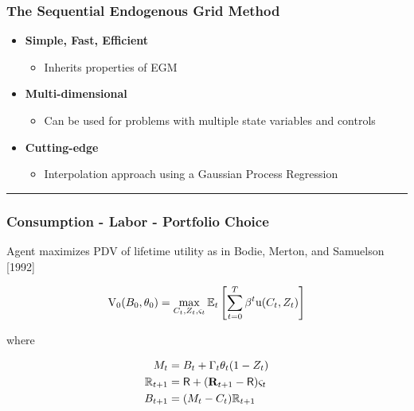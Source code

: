 \documentclass[
  letterpaper,
  DIV=11,
  numbers=noendperiod]{scrartcl}
\providecommand{\tightlist}{%
  \setlength{\itemsep}{0pt}\setlength{\parskip}{0pt}}\usepackage{longtable,booktabs,array}
\begin{document}
\hypertarget{the-sequential-endogenous-grid-method}{%
\subsubsection{The Sequential Endogenous Grid
Method}\label{the-sequential-endogenous-grid-method}}

\begin{itemize}
\tightlist
\item
  \textbf{Simple, Fast, Efficient}

  \begin{itemize}
  \tightlist
  \item
    Inherits properties of EGM
  \end{itemize}
\item
  \textbf{Multi-dimensional}

  \begin{itemize}
  \tightlist
  \item
    Can be used for problems with multiple state variables and controls
  \end{itemize}
\item
  \textbf{Cutting-edge}

  \begin{itemize}
  \tightlist
  \item
    Interpolation approach using a Gaussian Process Regression
  \end{itemize}
\end{itemize}

\begin{center}\rule{0.5\linewidth}{0.5pt}\end{center}

\hypertarget{consumption---labor---portfolio-choice}{%
\subsubsection{Consumption - Labor - Portfolio
Choice}\label{consumption---labor---portfolio-choice}}

Agent maximizes PDV of lifetime utility as in Bodie, Merton, and
Samuelson {[}1992{]}

\[\begin{equation}
\mathrm{V}_0(B_0, \theta_0) = \max_{C_{t}, Z_{t}, \varsigma_{t}} \mathbb{E}_{t} \left[ \sum_{t = 0}^{T} \beta^{t} \mathrm{u}(C_{t}, Z_{t})  \right]
\end{equation}\]

where

\[\begin{equation}
\begin{split}
    M_{t} & = B_{t} + \Gamma_{t} \theta_{t} (1 - Z_{t}) \\
    \mathbb{R}_{t+1} & = \mathsf{R} + (\mathbf{R}_{t+1} - \mathsf{R})
    \varsigma_{t} \\
    B_{t+1} & = (M_{t} - C_{t}) \mathbb{R}_{t+1}
  \end{split}
\end{equation}\]
\end{document}

